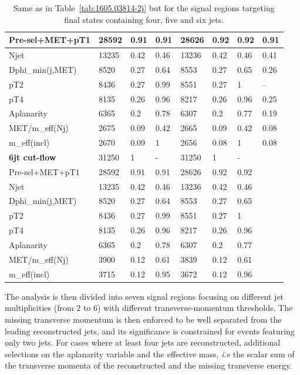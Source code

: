 \documentclass[11pt]{cernrep}
\begin{document}
\begin{table}
\begin{tabular}{ | l || l | l | l || l | l | l || l | }
Pre-sel+MET+pT1   & 28592 & 0.91 & 0.91 & 28626 & 0.92 & 0.92 & 0.91  \\ \hline
Njet              & 13235 & 0.42 & 0.46 & 13236 & 0.42 & 0.46 & 0.41  \\ \hline
Dphi\_min(j,MET)   & 8520 & 0.27 & 0.64 & 8553 & 0.27 & 0.65 & 0.26  \\ \hline
pT2               & 8436 & 0.27 & 0.99 & 8551 & 0.27 & 1 &    --        \\ \hline
pT4               & 8135 & 0.26 & 0.96 & 8217 & 0.26 & 0.96 & 0.25  \\ \hline
Aplanarity        & 6365 & 0.2 & 0.78 & 6307 & 0.2 & 0.77 & 0.19  \\ \hline
MET/m\_eff(Nj)     & 2675 & 0.09 & 0.42 & 2665 & 0.09 & 0.42 & 0.08  \\ \hline
m\_eff(incl)       & 2670 & 0.09 & 1 & 2656 & 0.08 & 1 & 0.08  \\ \hline
\hline
{\bf 6jt cut-flow} & 31250 & 1 & - & 31250 & 1 & - & \   \\ \hline
Pre-sel+MET+pT1   & 28592 & 0.91 & 0.91 & 28626 & 0.92 & 0.92 & \   \\ \hline
Njet              & 13235 & 0.42 & 0.46 & 13236 & 0.42 & 0.46 & \   \\ \hline
Dphi\_min(j,MET)   & 8520 & 0.27 & 0.64 & 8553 & 0.27 & 0.65 & \   \\ \hline
pT2               & 8436 & 0.27 & 0.99 & 8551 & 0.27 & 1 & \   \\ \hline
pT4               & 8135 & 0.26 & 0.96 & 8217 & 0.26 & 0.96 & \   \\ \hline
Aplanarity        & 6365 & 0.2 & 0.78 & 6307 & 0.2 & 0.77 & \   \\ \hline
MET/m\_eff(Nj)     & 3900 & 0.12 & 0.61 & 3839 & 0.12 & 0.61 & \   \\ \hline
m\_eff(incl)       & 3715 & 0.12 & 0.95 & 3672 & 0.12 & 0.96 & \   \\ \hline
 \end{tabular}
 \caption{Same as in Table~\ref{tab:1605.03814-2j} but for the signal regions
  targeting final states containing four, five and six jets.}
	\label{tab:1605.03814-nj}
\end{table}

The analysis is then divided into seven signal regions focusing on different jet
multiplicities (from 2 to 6) with different transverse-momentum thresholds. The
missing transverse momentum is then enforced to be well separated from the
leading reconstructed jets, and its significance is constrained for events
featuring only two jets. For cases where at least four jets are reconstructed,
additional selections on the aplanarity variable
and the effective mass, {\it i.e} the scalar sum of the transverse momenta of the
reconstructed and the missing transverse energy.
\end{document}
